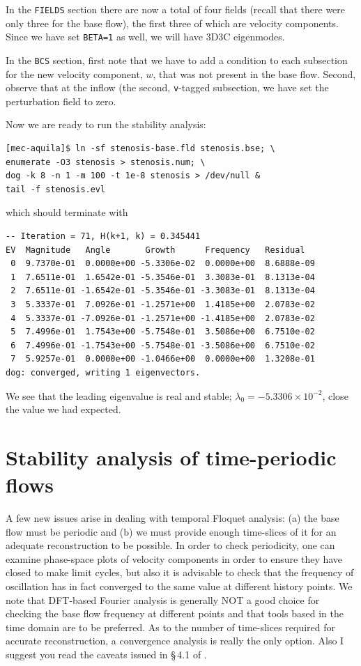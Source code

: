 \documentclass[11pt,a4paper]{report}
\newcommand{\eg}{e.g.\ }
\begin{document}
In the \verb+FIELDS+ section there are now a total of four fields
(recall that there were only three for the base flow), the first three
of which are velocity components.  Since we have set \verb+BETA=1+ as
well, we will have 3D3C eigenmodes.

In the \verb+BCS+ section, first note that we have to add a condition
to each subsection for the new velocity component, $w$, that was not
present in the base flow. Second, observe that at the inflow (the
second, \verb+v+-tagged subsection, we have set the perturbation field
to zero.

Now we are ready to run the stability analysis:
\begin{verbatim}
[mec-aquila]$ ln -sf stenosis-base.fld stenosis.bse; \
enumerate -O3 stenosis > stenosis.num; \
dog -k 8 -n 1 -m 100 -t 1e-8 stenosis > /dev/null &
tail -f stenosis.evl
\end{verbatim}
which should terminate with
{\small
\begin{verbatim}
-- Iteration = 71, H(k+1, k) = 0.345441
EV  Magnitude   Angle       Growth      Frequency   Residual
 0  9.7370e-01  0.0000e+00 -5.3306e-02  0.0000e+00  8.6888e-09
 1  7.6511e-01  1.6542e-01 -5.3546e-01  3.3083e-01  8.1313e-04
 2  7.6511e-01 -1.6542e-01 -5.3546e-01 -3.3083e-01  8.1313e-04
 3  5.3337e-01  7.0926e-01 -1.2571e+00  1.4185e+00  2.0783e-02
 4  5.3337e-01 -7.0926e-01 -1.2571e+00 -1.4185e+00  2.0783e-02
 5  7.4996e-01  1.7543e+00 -5.7548e-01  3.5086e+00  6.7510e-02
 6  7.4996e-01 -1.7543e+00 -5.7548e-01 -3.5086e+00  6.7510e-02
 7  5.9257e-01  0.0000e+00 -1.0466e+00  0.0000e+00  1.3208e-01
dog: converged, writing 1 eigenvectors.
\end{verbatim}
}\noindent We see that the leading eigenvalue is real and stable;
$\lambda_0=-5.3306\times10^{-2}$, close the value we had expected.


\chapter{Stability analysis of time-periodic flows}
\label{ch.floquet}

A few new issues arise in dealing with temporal Floquet analysis: (a)
the base flow must be periodic and (b) we must provide enough
time-slices of it for an adequate reconstruction to be possible.  In
order to check periodicity, one can examine phase-space plots of
velocity components in order to ensure they have closed to make limit
cycles, but also it is advisable to check that the frequency of
oscillation has in fact converged to the same value at different
history points.  We note that DFT-based Fourier analysis is generally
NOT a good choice for checking the base flow frequency at different
points and that tools based in the time domain \citep[\eg
  zero-crossing analysis, see chapter~8 of][]{newland93} are to be
preferred. As to the number of time-slices required for accurate
reconstruction, a convergence analysis is really the only option.
Also I suggest you read the caveats issued in \S\,4.1 of
\citet{bbs08b}.
\end{document}
